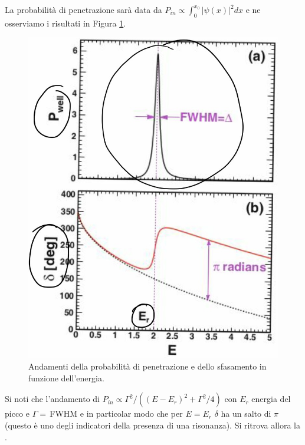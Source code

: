La probabilità di penetrazione sarà data da $P_{in}\propto \int_0^{x_0} |\psi(x)|^2 dx$ e ne osserviamo i risultati in Figura \ref{0325_ris3}.
\begin{figure}[h]
    \centering
    \includegraphics[scale=0.4]{Immagini/0325_risonanza3.png}
    \caption{Andamenti della probabilità di penetrazione e dello sfasamento in funzione dell'energia.}
    \label{0325_ris3}
\end{figure}
\noindent Si noti che l'andamento di $P_{in}\propto \Gamma^2/((E-E_r)^2+\Gamma^2/4)$ con $E_r$ energia del picco e $\Gamma = \,$FWHM e in particolar modo che per $E=E_r$ $\delta$ ha un salto di $\pi$ (questo è uno degli indicatori della presenza di una risonanza). Si ritrova allora la \BW{}.

\newpage

